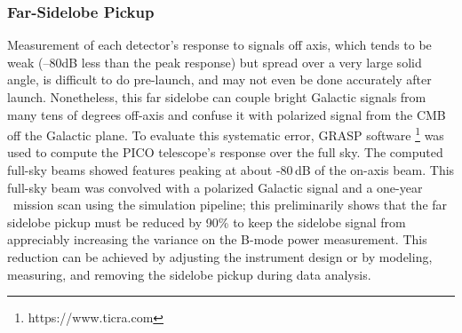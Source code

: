 \documentclass[PICOReport.tex]{subfiles}
\begin{document}


\subsubsection{Far-Sidelobe Pickup}
\label{sec:fsl}

Measurement of each detector's response to signals off axis, which tends to be weak (--80dB less than the peak response) but spread over a very large solid angle, is difficult to do pre-launch, and may not even be done accurately after launch.  Nonetheless, this far sidelobe can couple bright Galactic signals from many tens of degrees off-axis and confuse it with polarized signal from the CMB off the Galactic plane.    To evaluate this systematic error, GRASP software
\footnote{https://www.ticra.com} 
was used to compute the PICO telescope's response over the full sky.  The computed full-sky beams showed features peaking at about -80\,dB of the on-axis beam.   
This full-sky beam was convolved with a polarized Galactic signal and a one-year \pico\ mission scan using the simulation pipeline; this preliminarily shows that the far sidelobe pickup must be reduced by 90\%  to keep the sidelobe signal from appreciably increasing the variance on the B-mode power measurement.
This reduction can be achieved by adjusting the instrument design or by modeling, measuring, and removing the sidelobe pickup during data analysis.
\end{document}
